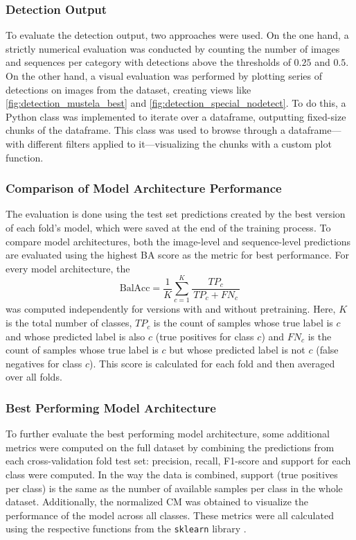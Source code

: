     \subsubsection{Detection Output}
    To evaluate the detection output, two approaches were used.
    On the one hand, a strictly numerical evaluation was conducted by counting the number of images and sequences per category with detections above the thresholds of \(0.25\) and \(0.5\).
    On the other hand, a visual evaluation was performed by plotting series of detections on images from the dataset, creating views like \autoref{fig:detection_mustela_best} and \autoref{fig:detection_special_nodetect}.
    To do this, a Python class was implemented to iterate over a dataframe, outputting fixed-size chunks of the dataframe.
    This class was used to browse through a dataframe---with different filters applied to it---visualizing the chunks with a custom plot function.

    \subsubsection{Comparison of Model Architecture Performance}
    The evaluation is done using the test set predictions created by the best version of each fold's model, which were saved at the end of the training process.
    To compare model architectures, both the image-level and sequence-level predictions are evaluated using the highest \ac{BA} score as the metric for best performance.
    For every model architecture, the
    \begin{equation}
        \text{BalAcc} =
        \frac{1}{K} \sum_{c=1}^{K}
        \frac{TP_{c}}{\,TP_{c} + FN_{c}\,}
    \end{equation}
    was computed independently for versions with and without pretraining.
    Here, \(K\) is the total number of classes, \(TP_{c}\) is the count of samples whose true label is \(c\) and whose predicted label is also \(c\) (true positives for class \(c\)) and \(FN_{c}\) is the count of samples whose true label is \(c\) but whose predicted label is not \(c\) (false negatives for class \(c\)).
    This score is calculated for each fold and then averaged over all folds.

    \subsubsection{Best Performing Model Architecture}
    To further evaluate the best performing model architecture, some additional metrics were computed on the full dataset by combining the predictions from each cross-validation fold test set:
    precision, recall, F1-score and support for each class were computed.
    In the way the data is combined, support (true positives per class) is the same as the number of available samples per class in the whole dataset.
    Additionally, the normalized \ac{CM} was obtained to visualize the performance of the model across all classes.
    These metrics were all calculated using the respective functions from the \texttt{sklearn} library \autocite{pedregosaScikitlearnMachineLearning2011}.

